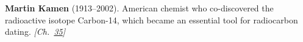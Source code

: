 \textbf{Martin Kamen} (1913–2002). American chemist who co-discovered the radioactive isotope Carbon-14, which became an essential tool for radiocarbon dating. \emph{[Ch.~\hyperref[ch:treesfromair]{35}]}

